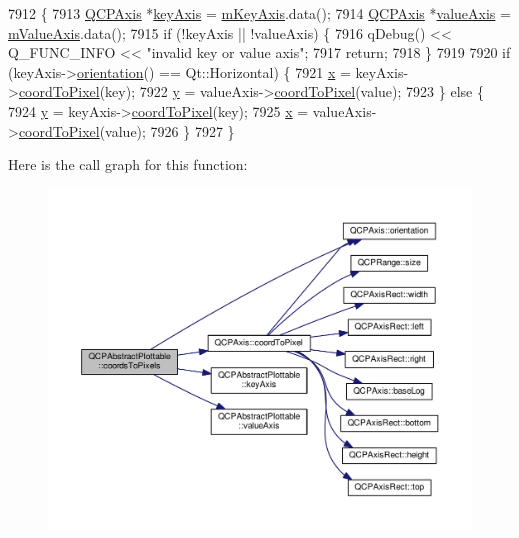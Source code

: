 \begin{DoxyCode}
7912                                                            \{
7913   \hyperlink{class_q_c_p_axis}{QCPAxis} *\hyperlink{class_q_c_p_abstract_plottable_a72c7a09c22963f2c943f07112b311103}{keyAxis} = \hyperlink{class_q_c_p_abstract_plottable_a426f42e254d0f8ce5436a868c61a6827}{mKeyAxis}.data();
7914   \hyperlink{class_q_c_p_axis}{QCPAxis} *\hyperlink{class_q_c_p_abstract_plottable_a3106f9d34d330a6097a8ec5905e5b519}{valueAxis} = \hyperlink{class_q_c_p_abstract_plottable_a2901452ca4aea911a1827717934a4bda}{mValueAxis}.data();
7915   \textcolor{keywordflow}{if} (!keyAxis || !valueAxis) \{
7916     qDebug() << Q\_FUNC\_INFO << \textcolor{stringliteral}{"invalid key or value axis"};
7917     \textcolor{keywordflow}{return};
7918   \}
7919 
7920   \textcolor{keywordflow}{if} (keyAxis->\hyperlink{class_q_c_p_axis_a57483f2f60145ddc9e63f3af53959265}{orientation}() == Qt::Horizontal) \{
7921     \hyperlink{_comparision_pictures_2_createtest_image_8m_a9336ebf25087d91c818ee6e9ec29f8c1}{x} = keyAxis->\hyperlink{class_q_c_p_axis_a985ae693b842fb0422b4390fe36d299a}{coordToPixel}(key);
7922     \hyperlink{_comparision_pictures_2_createtest_image_8m_a2fb1c5cf58867b5bbc9a1b145a86f3a0}{y} = valueAxis->\hyperlink{class_q_c_p_axis_a985ae693b842fb0422b4390fe36d299a}{coordToPixel}(value);
7923   \} \textcolor{keywordflow}{else} \{
7924     \hyperlink{_comparision_pictures_2_createtest_image_8m_a2fb1c5cf58867b5bbc9a1b145a86f3a0}{y} = keyAxis->\hyperlink{class_q_c_p_axis_a985ae693b842fb0422b4390fe36d299a}{coordToPixel}(key);
7925     \hyperlink{_comparision_pictures_2_createtest_image_8m_a9336ebf25087d91c818ee6e9ec29f8c1}{x} = valueAxis->\hyperlink{class_q_c_p_axis_a985ae693b842fb0422b4390fe36d299a}{coordToPixel}(value);
7926   \}
7927 \}
\end{DoxyCode}


Here is the call graph for this function\+:\nopagebreak
\begin{figure}[H]
\begin{center}
\leavevmode
\includegraphics[width=350pt]{class_q_c_p_abstract_plottable_ade710a776104b14c1c835168ce1bfc5c_cgraph}
\end{center}
\end{figure}




